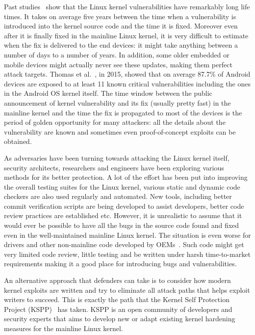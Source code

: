 Past studies~\cite{stoep2016android, cooklss2016} show that the Linux kernel vulnerabilities have remarkably long life times. It takes on average five years between the time when a vulnerability is introduced into the kernel source code and the time it is fixed. Moreover even after it is finally fixed in the mainline Linux kernel, it is very difficult to estimate when the fix is delivered to the end devices: it might take anything between a number of days to a number of years. In addition, some older embedded or mobile devices might actually never see these updates, making them perfect attack targets. Thomas et al.~\cite{Thomas2015}, in 2015, showed that on average 87.7\% of Android devices are exposed to at least 11 known critical vulnerabilities including the ones in the Android OS kernel itself. The time window between the public announcement of kernel vulnerability and its fix (usually pretty fast) in the mainline kernel and the time the fix is propagated to most of the devices is the period of golden opportunity for many attackers: all the details about the vulnerability are known and sometimes even proof-of-concept exploits can be obtained.

As adversaries have been turning towards attacking the Linux kernel itself, security architects, researchers and engineers have been exploring various methods for its better protection. A lot of the effort has been put into improving the overall testing suites for the Linux kernel, various static and dynamic code checkers are also used regularly and automated. New tools, including better commit verification scripts are being developed to assist developers, better code review practices are established etc. However, it is unrealistic to assume that it would ever be possible to have all the bugs in the source code found and fixed even in the well-maintained mainline Linux kernel. The situation is even worse for drivers and other non-mainline code developed by OEMs~\cite{stoep2016android}. Such code might get very limited code review, little testing and be written under harsh time-to-market requirements making it a good place for introducing bugs and vulnerabilities.

An alternative approach that defenders can take is to consider how modern kernel exploits are written and try to eliminate all attack paths that helps exploit writers to succeed. This is exactly the path that the Kernel Self Protection Project (KSPP)~\cite{kspp} has taken. KSPP is an open community of developers and security experts that aims to develop new or adapt existing kernel hardening measures for the mainline Linux kernel. 

